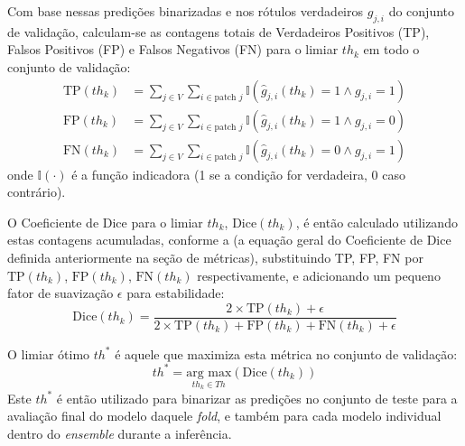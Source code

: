 Com base nessas predições binarizadas e nos rótulos verdadeiros $g_{j,i}$ do conjunto de validação, calculam-se as contagens totais de Verdadeiros Positivos (TP), Falsos Positivos (FP) e Falsos Negativos (FN) para o limiar $th_k$ em todo o conjunto de validação:
\begin{align}
    \text{TP}(th_k) &= \sum_{j \in V} \sum_{i \in \text{patch } j} \mathbb{I}(\hat{g}_{j,i}(th_k) = 1 \land g_{j,i} = 1) \label{eq:tp_th} \\ %
    \text{FP}(th_k) &= \sum_{j \in V} \sum_{i \in \text{patch } j} \mathbb{I}(\hat{g}_{j,i}(th_k) = 1 \land g_{j,i} = 0) \label{eq:fp_th} \\ %
    \text{FN}(th_k) &= \sum_{j \in V} \sum_{i \in \text{patch } j} \mathbb{I}(\hat{g}_{j,i}(th_k) = 0 \land g_{j,i} = 1) \label{eq:fn_th} %
\end{align}
onde $\mathbb{I}(\cdot)$ é a função indicadora (1 se a condição for verdadeira, 0 caso contrário).

O Coeficiente de Dice para o limiar $th_k$, $\text{Dice}(th_k)$, é então calculado utilizando estas contagens acumuladas, conforme a  (a equação geral do Coeficiente de Dice definida anteriormente na seção de métricas), substituindo TP, FP, FN por $\text{TP}(th_k)$, $\text{FP}(th_k)$, $\text{FN}(th_k)$ respectivamente, e adicionando um pequeno fator de suavização $\epsilon$ para estabilidade:
\begin{equation}\label{eq:dice_th} %
    \text{Dice}(th_k) = \frac{2 \times \text{TP}(th_k) + \epsilon}{2 \times \text{TP}(th_k) + \text{FP}(th_k) + \text{FN}(th_k) + \epsilon}
\end{equation}

O limiar ótimo $th^*$ é aquele que maximiza esta métrica no conjunto de validação:
\begin{equation}\label{eq:optimal_threshold} %
    th^* = \underset{th_k \in Th}{\text{arg max}} \left( \text{Dice}(th_k) \right)
\end{equation}
Este $th^*$ é então utilizado para binarizar as predições no conjunto de teste para a avaliação final do modelo daquele \textit{fold}, e também para cada modelo individual dentro do \textit{ensemble} durante a inferência.


